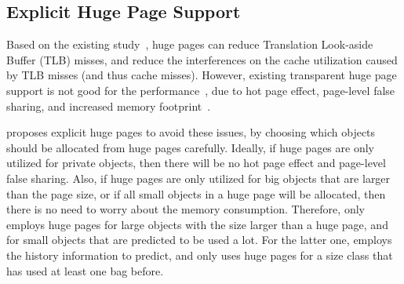 
\subsection{Explicit Huge Page Support} 
\label{sec:hugepage}

 Based on the existing study~\cite{hugepages}, huge pages can reduce Translation Look-aside Buffer (TLB) misses, and  reduce the interferences on the cache utilization caused by TLB misses (and thus cache misses). However, existing  transparent huge page support is not good for the performance~\cite{Gaud:2014:LPM:2643634.2643659, DBLP:conf/asplos/PanwarBG19}, due to hot page effect, page-level false sharing, and increased memory footprint~\cite{DBLP:conf/asplos/MaasAIJMR20}.
 
  


\NA{} proposes explicit huge pages to avoid these issues, by choosing which objects should be allocated from huge pages carefully. Ideally, if huge pages are only utilized for private objects, then there will be no hot page effect and page-level false sharing. Also, if huge pages are only utilized for big objects that are larger than the page size, or if all small objects in a huge page will be allocated, then there is no need to worry about the memory consumption. 
Therefore, \NM{} only employs huge pages for large objects with the size larger than a huge page, and for small objects that are predicted to be used a lot. For the latter one, \NM{} employs the history information to predict, and only uses huge pages for a size class that has used at least one bag before. 

